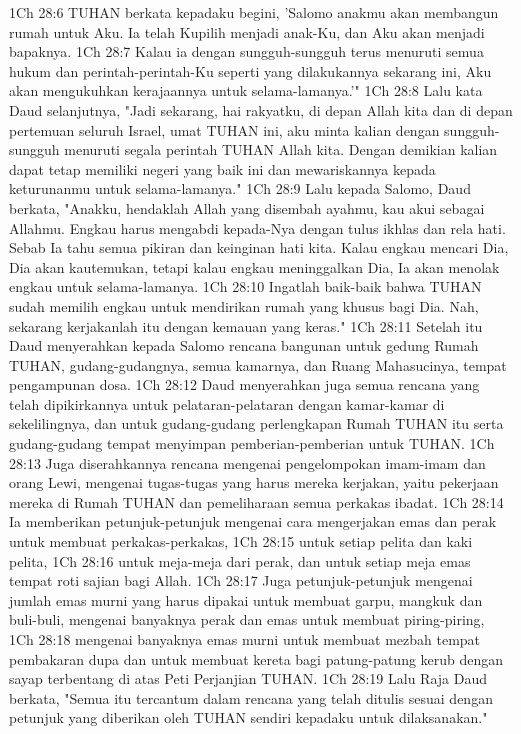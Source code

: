 1Ch 28:6  TUHAN berkata kepadaku begini, 'Salomo anakmu akan membangun rumah untuk Aku. Ia telah Kupilih menjadi anak-Ku, dan Aku akan menjadi bapaknya.
1Ch 28:7  Kalau ia dengan sungguh-sungguh terus menuruti semua hukum dan perintah-perintah-Ku seperti yang dilakukannya sekarang ini, Aku akan mengukuhkan kerajaannya untuk selama-lamanya.'"
1Ch 28:8  Lalu kata Daud selanjutnya, "Jadi sekarang, hai rakyatku, di depan Allah kita dan di depan pertemuan seluruh Israel, umat TUHAN ini, aku minta kalian dengan sungguh-sungguh menuruti segala perintah TUHAN Allah kita. Dengan demikian kalian dapat tetap memiliki negeri yang baik ini dan mewariskannya kepada keturunanmu untuk selama-lamanya."
1Ch 28:9  Lalu kepada Salomo, Daud berkata, "Anakku, hendaklah Allah yang disembah ayahmu, kau akui sebagai Allahmu. Engkau harus mengabdi kepada-Nya dengan tulus ikhlas dan rela hati. Sebab Ia tahu semua pikiran dan keinginan hati kita. Kalau engkau mencari Dia, Dia akan kautemukan, tetapi kalau engkau meninggalkan Dia, Ia akan menolak engkau untuk selama-lamanya.
1Ch 28:10  Ingatlah baik-baik bahwa TUHAN sudah memilih engkau untuk mendirikan rumah yang khusus bagi Dia. Nah, sekarang kerjakanlah itu dengan kemauan yang keras."
1Ch 28:11  Setelah itu Daud menyerahkan kepada Salomo rencana bangunan untuk gedung Rumah TUHAN, gudang-gudangnya, semua kamarnya, dan Ruang Mahasucinya, tempat pengampunan dosa.
1Ch 28:12  Daud menyerahkan juga semua rencana yang telah dipikirkannya untuk pelataran-pelataran dengan kamar-kamar di sekelilingnya, dan untuk gudang-gudang perlengkapan Rumah TUHAN itu serta gudang-gudang tempat menyimpan pemberian-pemberian untuk TUHAN.
1Ch 28:13  Juga diserahkannya rencana mengenai pengelompokan imam-imam dan orang Lewi, mengenai tugas-tugas yang harus mereka kerjakan, yaitu pekerjaan mereka di Rumah TUHAN dan pemeliharaan semua perkakas ibadat.
1Ch 28:14  Ia memberikan petunjuk-petunjuk mengenai cara mengerjakan emas dan perak untuk membuat perkakas-perkakas,
1Ch 28:15  untuk setiap pelita dan kaki pelita,
1Ch 28:16  untuk meja-meja dari perak, dan untuk setiap meja emas tempat roti sajian bagi Allah.
1Ch 28:17  Juga petunjuk-petunjuk mengenai jumlah emas murni yang harus dipakai untuk membuat garpu, mangkuk dan buli-buli, mengenai banyaknya perak dan emas untuk membuat piring-piring,
1Ch 28:18  mengenai banyaknya emas murni untuk membuat mezbah tempat pembakaran dupa dan untuk membuat kereta bagi patung-patung kerub dengan sayap terbentang di atas Peti Perjanjian TUHAN.
1Ch 28:19  Lalu Raja Daud berkata, "Semua itu tercantum dalam rencana yang telah ditulis sesuai dengan petunjuk yang diberikan oleh TUHAN sendiri kepadaku untuk dilaksanakan."
